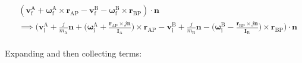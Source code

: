 \documentclass[12pt]{article}
\begin{document}
\begin{equation*}
\begin{aligned}
& (\mathbf{v}^\mathrm{A}_\mathrm{f} + \boldsymbol{\omega}^\mathrm{A}_\mathrm{f} \times \mathbf{r}_\mathrm{AP} - \mathbf{v}^\mathrm{B}_\mathrm{f} - \boldsymbol{\omega}^\mathrm{B}_\mathrm{f} \times \mathbf{r}_\mathrm{BP}) \cdot \mathbf{n} \\
&\implies \bigg(\mathbf{v}^\mathrm{A}_\mathrm{i} + \frac{j}{m_\mathrm{A}}\mathbf{n} + \bigg(\boldsymbol{\omega}^\mathrm{A}_\mathrm{i} + \frac{\mathbf{r}_\mathrm{AP} \times j\mathbf{n}}{\mathbf{I}_\mathrm{A}}\bigg) \times \mathbf{r}_\mathrm{AP} - \mathbf{v}^\mathrm{B}_\mathrm{i} + \frac{j}{m_\mathrm{B}}\mathbf{n} - \bigg(\boldsymbol{\omega}^\mathrm{B}_\mathrm{i} - \frac{\mathbf{r}_\mathrm{BP} \times j\mathbf{n}}{\mathbf{I}_\mathrm{B}}\bigg) \times \mathbf{r}_\mathrm{BP}\bigg) \cdot \mathbf{n}
\end{aligned}
\end{equation*}
\\
\noindent
Expanding and then collecting terms:
\end{document}

